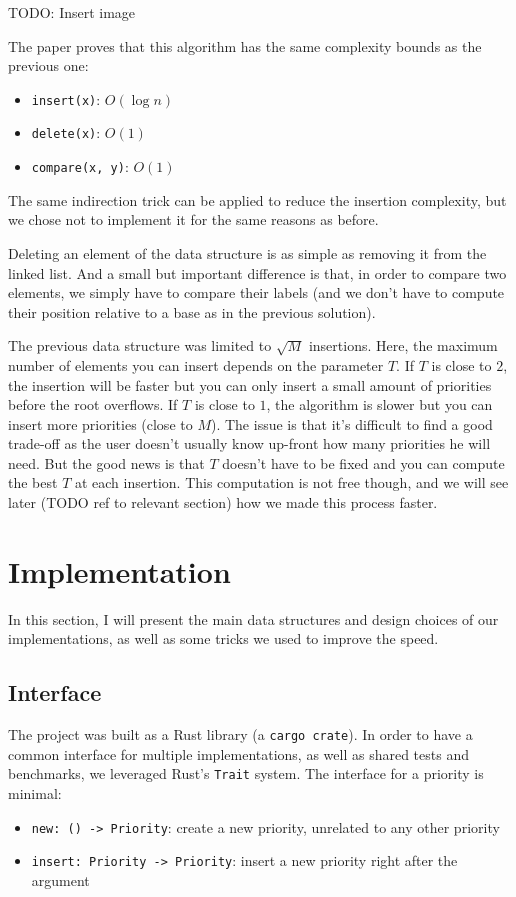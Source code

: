 \documentclass[12pt]{article}
\begin{document}
TODO: Insert image

The paper proves that this algorithm has the same complexity bounds as the previous one:
\begin{itemize}
  \item \texttt{insert(x)}: $O(\log n)$
  \item \texttt{delete(x)}: $O(1)$
  \item \texttt{compare(x, y)}: $O(1)$
\end{itemize}

The same indirection trick can be applied to reduce the insertion complexity, but we chose not to implement it for the same reasons as before.

Deleting an element of the data structure is as simple as removing it from the linked list.
And a small but important difference is that, in order to compare two elements, we simply have to compare their labels (and we don't have to compute their position relative to a base as in the previous solution).

The previous data structure was limited to $\sqrt{M}$ insertions. Here, the maximum number of elements you can insert depends on the parameter $T$. If $T$ is close to $2$, the insertion will be faster but you can only insert a small amount of priorities before the root overflows. If $T$ is close to $1$, the algorithm is slower but you can insert more priorities (close to $M$).
The issue is that it's difficult to find a good trade-off as the user doesn't usually know up-front how many priorities he will need.
But the good news is that $T$ doesn't have to be fixed and you can compute the best $T$ at each insertion.
This computation is not free though, and we will see later (TODO ref to relevant section) how we made this process faster.

\newpage
\section{Implementation}

In this section, I will present the main data structures and design choices of our implementations, as well as some tricks we used to improve the speed.

\subsection{Interface}

The project was built as a Rust library (a \lstinline{cargo crate}). In order to have a common interface for multiple implementations, as well as shared tests and benchmarks, we leveraged Rust's \lstinline{Trait} system. The interface for a priority is minimal:
\begin{itemize}
  \item \lstinline{new: () -> Priority}: create a new priority, unrelated to any other priority
  \item \lstinline{insert: Priority -> Priority}: insert a new priority right after the argument
\end{itemize}
\end{document}
